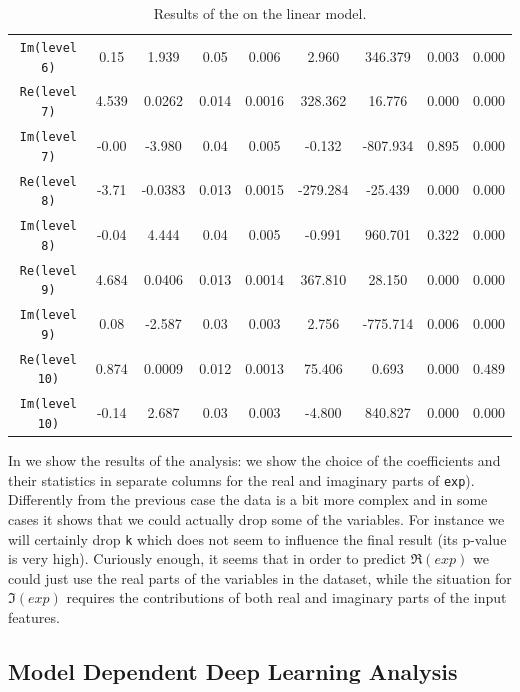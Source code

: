\begin{table}[htbp]
{\begin{tabular}{@{}ccccccccc@{}}
  \texttt{Im(level 6)}   & 0.15   & 1.939   & 0.05  & 0.006   & 2.960    & 346.379  & 0.003  & 0.000  \\
  \texttt{Re(level 7)}   & 4.539  & 0.0262  & 0.014 & 0.0016  & 328.362  & 16.776   & 0.000  & 0.000  \\
  \texttt{Im(level 7)}   & -0.00  & -3.980  & 0.04  & 0.005   & -0.132   & -807.934 & 0.895  & 0.000  \\
  \texttt{Re(level 8)}   & -3.71  & -0.0383 & 0.013 & 0.0015  & -279.284 & -25.439  & 0.000  & 0.000  \\
  \texttt{Im(level 8)}   & -0.04  & 4.444   & 0.04  & 0.005   & -0.991   & 960.701  & 0.322  & 0.000  \\
  \texttt{Re(level 9)}   & 4.684  & 0.0406  & 0.013 & 0.0014  & 367.810  & 28.150   & 0.000  & 0.000  \\
  \texttt{Im(level 9)}   & 0.08   & -2.587  & 0.03  & 0.003   & 2.756    & -775.714 & 0.006  & 0.000  \\
  \texttt{Re(level 10)}  & 0.874  & 0.0009  & 0.012 & 0.0013  & 75.406   & 0.693    & 0.000  & 0.489  \\
  \texttt{Im(level 10)}  & -0.14  & 2.687   & 0.03  & 0.003   & -4.800   & 840.827  & 0.000  & 0.000  \\                                                  
  \bottomrule
  \end{tabular}%
  }
  \caption{Results of the \anova on the linear model.}
  \label{tab:wzw:anova}
\end{table}

In  we show the results of the analysis: we show the choice of the coefficients and their statistics in separate columns for the real and imaginary parts of \texttt{exp}).
Differently from the previous case the data is a bit more complex and in some cases it shows that we could actually drop some of the variables.
For instance we will certainly drop \texttt{k} which does not seem to influence the final result (its p-value is very high).
Curiously enough, it seems that in order to predict $\Re(exp)$ we could just use the real parts of the variables in the dataset, while the situation for $\Im(exp)$ requires the contributions of both real and imaginary parts of the input features.


\subsection{Model Dependent Deep Learning Analysis}


